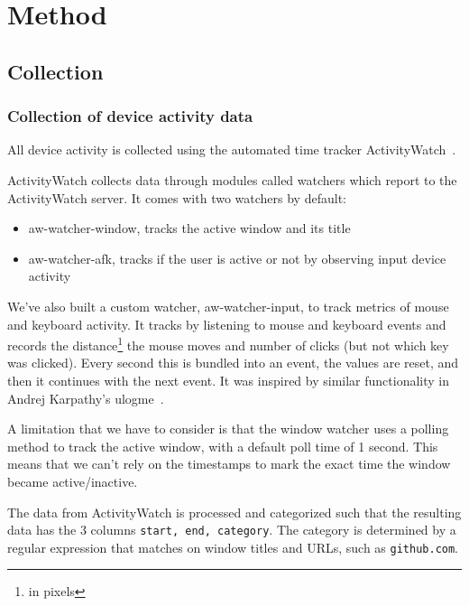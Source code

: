 \section{Method}

\subsection{Collection}

    \subsubsection{Collection of device activity data}

        All device activity is collected using the automated time tracker ActivityWatch~\cite{bjareholt_activitywatch_2020-1}.

        ActivityWatch collects data through modules called watchers which report to the ActivityWatch server. It comes with two watchers by default:

        \begin{itemize}
            \item aw-watcher-window, tracks the active window and its title
            \item aw-watcher-afk, tracks if the user is active or not by observing input device activity
        \end{itemize}

        We've also built a custom watcher, aw-watcher-input, to track metrics of mouse and keyboard activity. It tracks by listening to mouse and keyboard events and records the distance\footnote{in pixels} the mouse moves and number of clicks (but not which key was clicked). Every second this is bundled into an event, the values are reset, and then it continues with the next event. It was inspired by similar functionality in Andrej Karpathy's ulogme~\cite{ulogme}.

        A limitation that we have to consider is that the window watcher uses a polling method to track the active window, with a default poll time of 1 second. This means that we can't rely on the timestamps to mark the exact time the window became active/inactive.

        The data from ActivityWatch is processed and categorized such that the resulting data has the 3 columns \texttt{start, end, category}. The category is determined by a regular expression that matches on window titles and URLs, such as \texttt{github.com}.

